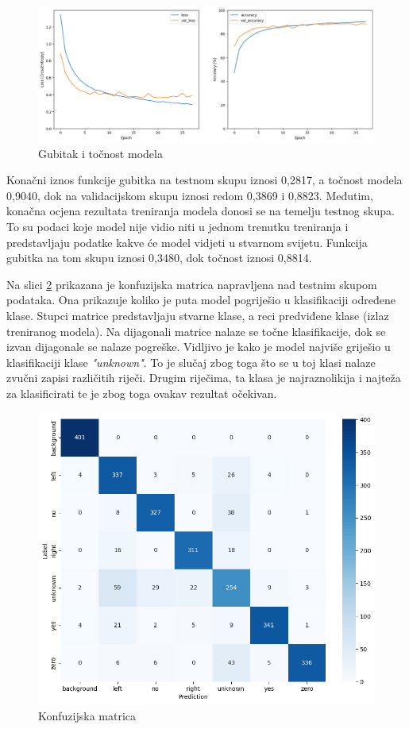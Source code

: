 \begin{figure}[htb]
    \centering
    \includegraphics[width=1\linewidth]{Chapters/neuronska_mreza/trening/acc.png} 
    \caption{Gubitak i točnost modela}
    \label{pic:accuracy}
\end{figure}

Konačni iznos funkcije gubitka na testnom skupu iznosi 0,2817, a točnost modela 0,9040, dok
na validacijskom skupu iznosi redom 0,3869 i 0,8823. Međutim, konačna ocjena rezultata
treniranja modela donosi se na temelju testnog skupa. To su podaci koje model nije vidio
niti u jednom trenutku treniranja i predstavljaju podatke kakve će model vidjeti u stvarnom
svijetu. Funkcija gubitka na tom skupu iznosi 0,3480, dok točnost iznosi 0,8814.

Na slici \ref{pic:confmtrx} prikazana je konfuzijska matrica napravljena nad
testnim skupom podataka. Ona prikazuje koliko je puta model pogriješio u klasifikaciji
određene klase. Stupci matrice predstavljaju stvarne klase, a reci predviđene klase
(izlaz treniranog modela). Na dijagonali matrice nalaze se točne klasifikacije, dok
se izvan dijagonale se nalaze pogreške. Vidljivo je kako je model najviše griješio
u klasifikaciji klase \textit{"unknown"}. To je slučaj zbog toga što se u toj klasi nalaze
zvučni zapisi različitih riječi. Drugim riječima, ta klasa je najraznolikija i najteža
za klasificirati te je zbog toga ovakav rezultat očekivan.

\begin{figure}[htb]
    \centering
    \includegraphics[width=0.7\linewidth]{Chapters/neuronska_mreza/trening/image.png} 
    \caption{Konfuzijska matrica}
    \label{pic:confmtrx}
\end{figure}


